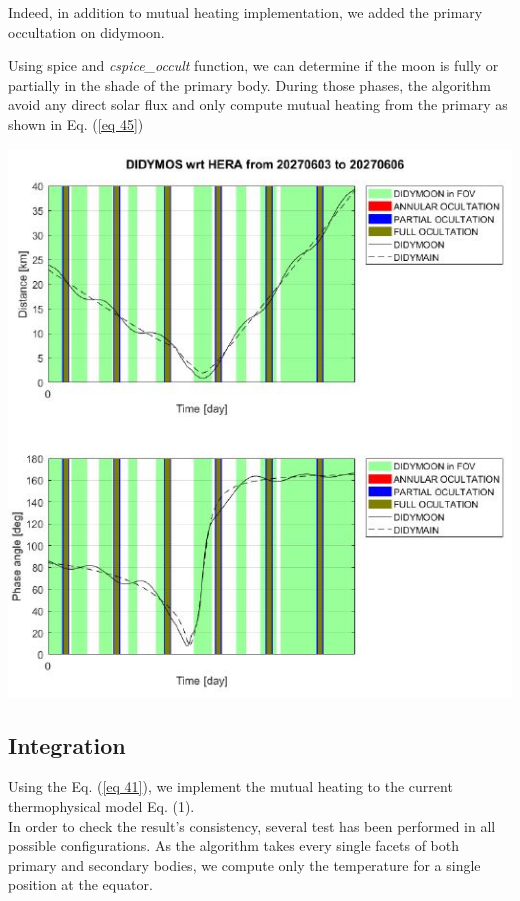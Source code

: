 Indeed, in addition to mutual heating implementation, we added the primary occultation on didymoon.

Using spice and \textit{cspice\_occult} function, we can determine if the moon is fully or partially in the shade of the primary body. During those phases, the algorithm avoid any direct solar flux and only compute mutual heating from the primary as shown in Eq. (\ref{eq 45})

\begin{center}
    \includegraphics[scale=0.55]{rsc/occult.jpg}
\end{center}

\subsection{Integration}

Using the Eq. (\ref{eq 41}), we implement the mutual heating to the current thermophysical model Eq. (1).\\

In order to check the result's consistency, several test has been performed in all possible configurations. As the algorithm takes every single facets of both primary and secondary bodies, we compute only the temperature for a single position at the equator.\\

